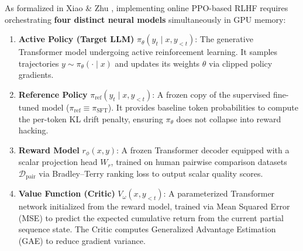 \documentclass[../../../main.tex]{subfiles}
\begin{document}
As formalized in Xiao \& Zhu \citep{xiao2025}, implementing online PPO-based RLHF requires orchestrating \textbf{four distinct neural models} simultaneously in GPU memory:
\begin{enumerate}
    \item \textbf{Active Policy (Target LLM)} $\pi_\theta(y_t \mid x, y_{<t})$: The generative Transformer model undergoing active reinforcement learning. It samples trajectories $y \sim \pi_\theta(\cdot \mid x)$ and updates its weights $\theta$ via clipped policy gradients.
    \item \textbf{Reference Policy} $\pi_{\text{ref}}(y_t \mid x, y_{<t})$: A frozen copy of the supervised fine-tuned model ($\pi_{\text{ref}} \equiv \pi_{\text{SFT}}$). It provides baseline token probabilities to compute the per-token KL drift penalty, ensuring $\pi_\theta$ does not collapse into reward hacking.
    \item \textbf{Reward Model} $r_\phi(x, y)$: A frozen Transformer decoder equipped with a scalar projection head $W_r$, trained on human pairwise comparison datasets $\mathcal{D}_{\text{pair}}$ via Bradley--Terry ranking loss to output scalar quality scores.
    \item \textbf{Value Function (Critic)} $V_\omega(x, y_{<t})$: A parameterized Transformer network initialized from the reward model, trained via Mean Squared Error (MSE) to predict the expected cumulative return from the current partial sequence state. The Critic computes Generalized Advantage Estimation (GAE) to reduce gradient variance.
\end{enumerate}
\end{document}
